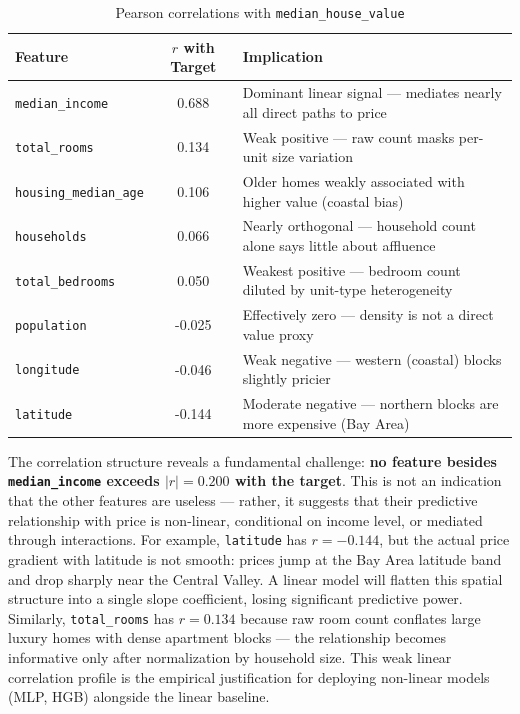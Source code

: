 \begin{table}[H]
\centering{}
\begin{tabular}{l c l}
\toprule\rowcolor{tablehead!80}\color{white}\textbf{Feature} &\color{white}\textbf{$r$ with Target} &\color{white}\textbf{Implication}\\
\midrule
\texttt{median\_income}            & 0.688 & Dominant linear signal — mediates nearly all direct paths to price\\
\texttt{total\_rooms}             & 0.134 & Weak positive — raw count masks per-unit size variation\\
\texttt{housing\_median\_age}     & 0.106 & Older homes weakly associated with higher value (coastal bias)\\
\texttt{households}               & 0.066 & Nearly orthogonal — household count alone says little about affluence\\
\texttt{total\_bedrooms}          & 0.050 & Weakest positive — bedroom count diluted by unit-type heterogeneity\\
\texttt{population}               & -0.025 & Effectively zero — density is not a direct value proxy\\
\texttt{longitude}                & -0.046 & Weak negative — western (coastal) blocks slightly pricier\\
\texttt{latitude}                 & -0.144 & Moderate negative — northern blocks are more expensive (Bay Area)\\
\bottomrule
\end{tabular}
\caption{Pearson correlations with \texttt{median\_house\_value}}
\end{table}

The correlation structure reveals a fundamental challenge: \textbf{no feature besides \texttt{median\_income} exceeds $|r| = 0.200$ with the target}. This is not an indication that the other features are useless — rather, it suggests that their predictive relationship with price is non-linear, conditional on income level, or mediated through interactions. For example, \texttt{latitude} has $r = -0.144$, but the actual price gradient with latitude is not smooth: prices jump at the Bay Area latitude band and drop sharply near the Central Valley. A linear model will flatten this spatial structure into a single slope coefficient, losing significant predictive power. Similarly, \texttt{total\_rooms} has $r = 0.134$ because raw room count conflates large luxury homes with dense apartment blocks — the relationship becomes informative only after normalization by household size. This weak linear correlation profile is the empirical justification for deploying non-linear models (MLP, HGB) alongside the linear baseline.

